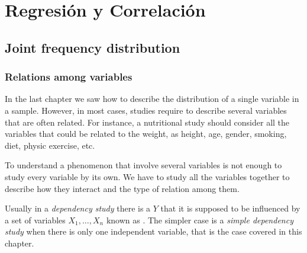 \section{Regresión y Correlación}



\subsection{Joint frequency distribution}

\begin{frame}
\frametitle{Relations among variables}
In the last chapter we saw how to describe the distribution of a single variable in a sample. 
However, in most cases, studies require to describe several variables that are often related.
For instance, a nutritional study should consider all the variables that could be related to the weight, as height, age,
gender, smoking, diet, physic exercise, etc.

To understand a phenomenon that involve several variables is not enough to study every variable by its own. 
We have to study all the variables together to describe how they interact and the type of relation among them. 

Usually in a \emph{dependency study} there is a  $Y$ that it is supposed to be influenced
by a set of variables $X_1,\ldots,X_n$ known as . 
The simpler case is a \emph{simple dependency study} when there is only one independent variable, that is the case
covered in this chapter. 
\end{frame}


